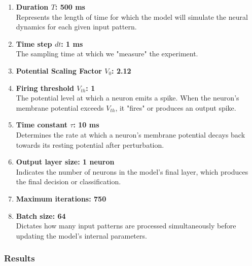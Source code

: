 \begin{enumerate}
    \item \textbf{Duration \( T \): 500 ms} \\
    Represents the length of time for which the model will simulate the neural dynamics for each given input pattern.
    
    \item \textbf{Time step \( dt \): 1 ms} \\
    The sampling time at which we "measure" the experiment.
    
    \item \textbf{Potential Scaling Factor \( V_0 \): 2.12} 
    
    \item \textbf{Firing threshold \( V_{th} \): 1} \\
    The potential level at which a neuron emits a spike. When the neuron's membrane potential exceeds \( V_{th} \), it "fires" or produces an output spike.
    
    \item \textbf{Time constant \( \tau \): 10 ms} \\
    Determines the rate at which a neuron's membrane potential decays back towards its resting potential after perturbation.
    
    \item \textbf{Output layer size: 1 neuron} \\
    Indicates the number of neurons in the model's final layer, which produces the final decision or classification.
    
    \item \textbf{Maximum iterations: 750} 

    \item \textbf{Batch size: 64} \\
    Dictates how many input patterns are processed simultaneously before updating the model's internal parameters. 

\end{enumerate}

\subsubsection{Results}

